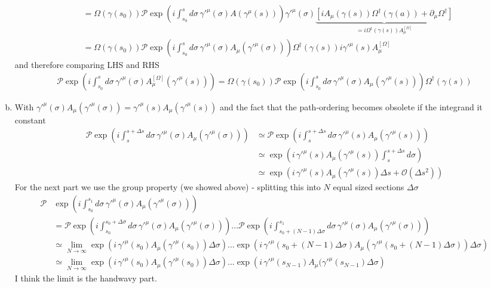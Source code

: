\documentclass[10pt,a4paper]{article}
\theoremstyle{definition}
\begin{document}
\begin{enumerate}[a.)]
\begin{align}
&=\Omega(\gamma(s_0))\mathcal{P} \exp\left( i \int_{s_0}^s d\sigma\, \gamma'^\mu(\sigma)A(\gamma^{\mu}(s))\right)\gamma'^\mu(\sigma)\underbrace{\left[iA_\mu(\gamma(s))\Omega^\dagger(\gamma(a))+\partial_\mu\Omega^\dagger\right]}_{=i\Omega^\dagger(\gamma(s)) A_\mu^{[\Omega]}}\\
&=\Omega(\gamma(s_0))\mathcal{P} \exp\left( i \int_{s_0}^s d\sigma\, \gamma'^\mu(\sigma)A_\mu(\gamma'^{\mu}(\sigma))\right)\Omega^\dagger(\gamma(s)) i\gamma'^\mu(s)A_\mu^{[\Omega]}
\end{align}
and therefore comparing LHS and RHS
\begin{align}
\mathcal{P} \exp\left( i \int_{s_0}^s d\sigma\, \gamma'^\mu(\sigma)A^{[\Omega]}_\mu(\gamma'^{\mu}(s))\right)=\Omega(\gamma(s_0))\mathcal{P} \exp\left( i \int_{s_0}^s d\sigma\, \gamma'^\mu(\sigma)A_\mu(\gamma'^{\mu}(s))\right)\Omega^\dagger(\gamma(s))
\end{align}
\item With $\gamma'^\mu(\sigma)A_\mu(\gamma'^{\mu}(\sigma)) =\gamma'^\mu(s)A_\mu(\gamma'^{\mu}(s))$ and the fact that the path-ordering becomes obsolete if the integrand it constant 
\begin{align}
\mathcal{P} \exp\left( i \int_{s}^{s+\Delta s} d\sigma\, \gamma'^\mu(\sigma)A_\mu(\gamma'^{\mu}(\sigma))\right)
&\simeq\mathcal{P} \exp\left( i \int_{s}^{s+\Delta s} d\sigma\, \gamma'^\mu(s)A_\mu(\gamma'^{\mu}(s))\right)\\
&\simeq \exp\left( i\,\gamma'^\mu(s)A_\mu(\gamma'^{\mu}(s))\int_{s}^{s+\Delta s} d\sigma\right)\\
&\simeq \exp\left( i\,\gamma'^\mu(s)A_\mu(\gamma'^{\mu}(s))\Delta s+\mathcal{O}(\Delta s^2)\right)
\end{align}
For the next part we use the group property (we showed above) - splitting this into $N$ equal sized sections $\Delta\sigma$
\begin{align}
\mathcal{P} &\exp\left( i \int_{s_0}^{s_1} d\sigma\, \gamma'^\mu(\sigma)A_\mu(\gamma'^{\mu}(\sigma))\right)\\
&=\mathcal{P} \exp\left( i \int_{s_0}^{s_0+\Delta \sigma} d\sigma\, \gamma'^\mu(\sigma)A_\mu(\gamma'^{\mu}(\sigma))\right)...\mathcal{P} \exp\left( i \int_{s_0+(N-1)\Delta\sigma}^{s_1} d\sigma\, \gamma'^\mu(\sigma)A_\mu(\gamma'^{\mu}(\sigma))\right)\\
&\simeq\lim_{N\rightarrow\infty} \exp\left( i\,\gamma'^\mu(s_0)A_\mu(\gamma'^{\mu}(s_0))\Delta\sigma\right)...\exp\left( i\,\gamma'^\mu(s_0+(N-1)\Delta\sigma)A_\mu(\gamma'^{\mu}(s_0+(N-1)\Delta\sigma))\Delta\sigma\right)\\
&\simeq\lim_{N\rightarrow\infty} \exp\left( i\,\gamma'^\mu(s_0)A_\mu(\gamma'^{\mu}(s_0))\Delta\sigma\right)...\exp\left( i\,\gamma'^\mu(s_{N-1})A_\mu(\gamma'^{\mu}(s_{N-1})\Delta\sigma\right)
\end{align}
I think the limit is the handwavy part. 
\end{enumerate}
\end{document}
